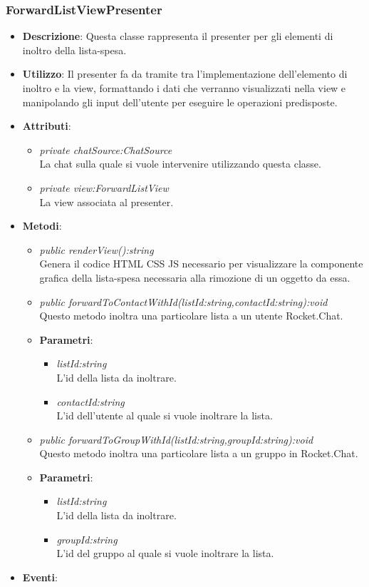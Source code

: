 \subsubsection{ForwardListViewPresenter}
\begin{itemize}
\item \textbf{Descrizione}: Questa classe rappresenta il presenter per gli elementi di inoltro della lista-spesa.
\item \textbf{Utilizzo}: Il presenter fa da tramite tra l'implementazione dell'elemento di inoltro e la view, formattando i dati che verranno visualizzati nella view e manipolando gli input dell'utente per eseguire le operazioni predisposte.
\item \textbf{Attributi}: 
	\begin{itemize}
	\item \textit{private chatSource:ChatSource}\\
	La chat sulla quale si vuole intervenire utilizzando questa classe.
	\item \textit{private view:ForwardListView}\\
	La view associata al presenter.
	\end{itemize}
\item \textbf{Metodi}:
	\begin{itemize}	
	\item \textit{public renderView():string}\\
		Genera il codice HTML CSS JS necessario per visualizzare la componente grafica della lista-spesa necessaria alla rimozione di un oggetto da essa.
	\item \textit{public forwardToContactWithId(listId:string,contactId:string):void}\\
	Questo metodo inoltra una particolare lista a un utente Rocket.Chat.
			\item{\textbf{Parametri}: \begin{itemize}
			\item \textit{listId:string}\\
			L'id della lista da inoltrare.
			\item \textit{contactId:string}\\
			L'id dell'utente al quale si vuole inoltrare la lista.
			\end{itemize}}
	\item \textit{public forwardToGroupWithId(listId:string,groupId:string):void}\\
	Questo metodo inoltra una particolare lista a un gruppo in Rocket.Chat.
			\item{\textbf{Parametri}: \begin{itemize}
			\item \textit{listId:string}\\
			L'id della lista da inoltrare.
			\item \textit{groupId:string}\\
			L'id del gruppo al quale si vuole inoltrare la lista.
			\end{itemize}}
	\end{itemize}
\item \textbf{Eventi}:
\end{itemize}

